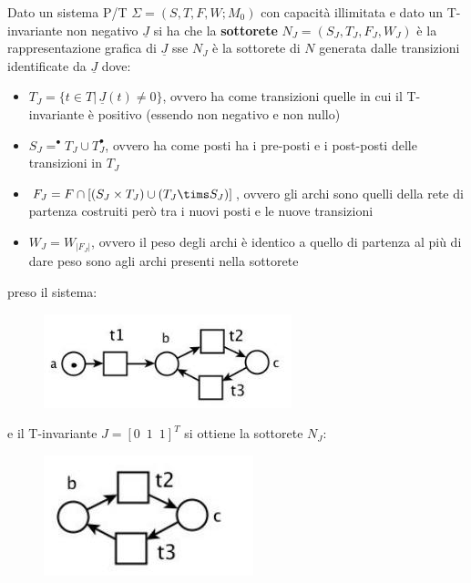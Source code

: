 \documentclass[a4paper,12pt, oneside]{book}
\begin{document}
\begin{definizione}
  Dato un sistema P/T $\Sigma=(S,T,F,W;M_0)$ con capacità illimitata e dato un
  T-invariante non negativo $\underline{J}$ si ha che la \textbf{sottorete} $N_J
  = (S_J , T_J , F_J , W_J)$ è la rappresentazione grafica di $\underline{J}$
  sse $N_J$ è la sottorete di $N$ generata dalle transizioni identificate da
  $\underline{J}$ dove:
  \begin{itemize}
    \item $T_J=\{t\in T|\,\underline{J}(t)\neq 0\}$, ovvero ha come transizioni
    quelle in cui il T-invariante è positivo (essendo non negativo e non nullo)
    \item $S_J=^\bullet T_J\cup T_J^\bullet$, ovvero ha come posti ha i pre-posti
    e i post-posti delle transizioni in $T_J$
    \item $F_J=F\cap[(S_J\times T_J)\cup(T_J\tims S_J)]$, ovvero gli archi sono
    quelli della rete di partenza costruiti però tra i nuovi posti e le nuove
    transizioni 
    \item $W_J=W_{|F_J|}$, ovvero il peso degli archi è identico a quello di
    partenza al più di dare peso sono agli archi presenti nella sottorete
  \end{itemize}
  \begin{esempio}
    preso il sistema:
    \begin{figure}[H]
      \centering
      \includegraphics[scale = 0.6]{img/ti.jpg}
    \end{figure}
    e il T-invariante $J=[0\,\,\,1\,\,\,1]^T$ si ottiene la sottorete $N_J$:
    \begin{figure}[H]
      \centering
      \includegraphics[scale = 0.5]{img/ti3.jpg}
    \end{figure}
  \end{esempio}
\end{definizione}
\end{document}
